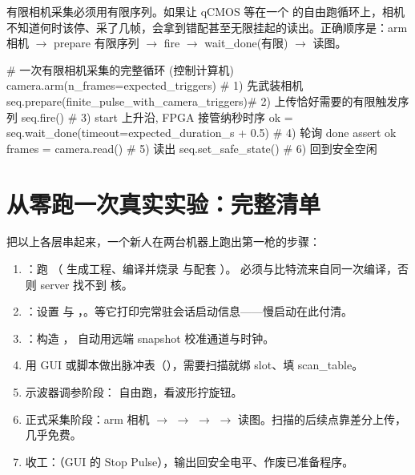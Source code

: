 \documentclass[11pt,oneside,openany]{book}
\begin{document}
\begin{notebox}
有限相机采集必须用有限序列。如果让 qCMOS 等在一个  的自由跑循环上，相机不知道何时该停、采了几帧，会拿到错配甚至无限挂起的读出。正确顺序是：arm 相机 $\to$ prepare 有限序列 $\to$ fire $\to$ wait\_done(有限) $\to$ 读图。
\end{notebox}

\begin{codeblock}[Python]
# 一次有限相机采集的完整循环 (控制计算机)
camera.arm(n_frames=expected_triggers)        # 1) 先武装相机
seq.prepare(finite_pulse_with_camera_triggers)# 2) 上传恰好需要的有限触发序列
seq.fire()                                     # 3) start 上升沿, FPGA 接管纳秒时序
ok = seq.wait_done(timeout=expected_duration_s + 0.5)  # 4) 轮询 done
assert ok
frames = camera.read()                          # 5) 读出
seq.set_safe_state()                            # 6) 回到安全空闲
\end{codeblock}

\section{从零跑一次真实实验：完整清单}

把以上各层串起来，一个新人在两台机器上跑出第一枪的步骤：

\begin{enumerate}
\item {}：跑 （ 生成工程、编译并烧录  与配套 ）。 必须与比特流来自同一次编译，否则 server 找不到  核。
\item {}：设置  与 ，。等它打印完常驻会话启动信息——慢启动在此付清。
\item {}：构造 ， 自动用远端 snapshot 校准通道与时钟。
\item 用 GUI 或脚本做出脉冲表（），需要扫描就绑 slot、填 scan\_table。
\item 示波器调参阶段： 自由跑，看波形拧旋钮。
\item 正式采集阶段：arm 相机 $\to$  $\to$  $\to$  $\to$ 读图。扫描的后续点靠差分上传，几乎免费。
\item 收工：（GUI 的 Stop Pulse），输出回安全电平、作废已准备程序。
\end{enumerate}
\end{document}
